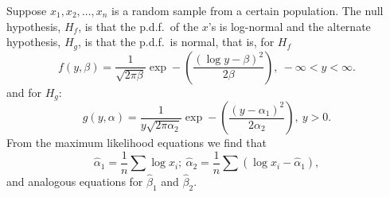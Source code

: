 \documentclass[draft]{article}
\begin{document}
Suppose \(x_1, x_2, \ldots, x_n\) is a random sample from a certain
population. The null hypothesis, \(H_f\), is that the p.d.f.\ of the
\(x\)'s is log-normal and the alternate hypothesis, \(H_g\), is
that the p.d.f.\ is normal, that is, for \(H_f\)
\begin{equation}
f\left(y,\beta\right) = \frac{1}{\sqrt{2\pi\beta}}
\exp-\left(\frac{\left(\log y-\beta\right)^2}{2\beta}\right),
\: -\infty < y< \infty.
\end{equation}
and for \(H_g\):
\begin{equation}
g\left(y,\alpha\right) = \frac{1}{y\sqrt{2\pi\alpha_2}}
\exp-\left(\frac{\left(y-\alpha_1\right)^2}{2\alpha_2}\right),
\: y>0.
\end{equation}
From the maximum likelihood equations we find that
\begin{equation}
\hat{\alpha}_1=\frac{1}{n}\sum\log x_i; \:
\hat{\alpha}_2=\frac{1}{n}\sum\left(\log x_i-\hat{\alpha}_1\right),
\end{equation}
and analogous equations for \(\hat{\beta}_1\)
and \(\hat{\beta}_2\).
\end{document}
